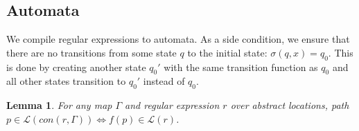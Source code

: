 \documentclass[twocolumn]{sig-alternate-10pt}
\newtheorem{lem}[thm]{Lemma}
\begin{document}
\subsection{Automata}

\newcommand{\Lang}{\ensuremath{\mathcal{L}}}

We compile regular expressions to automata. As a side condition, we ensure that there are no transitions from some state $q$ to the initial state: $\sigma(q,x) = q_0$. This is done by creating another state $q_0'$ with the same transition function as $q_0$ and all other states transition to $q_0'$ instead of $q_0$.

\begin{lem}
  For any map $\Gamma$ and regular expression $r$ over abstract locations, path $p \in \Lang(con(r,\Gamma)) \iff f(p) \in \Lang(r)$.
\end{lem}
\end{document}
